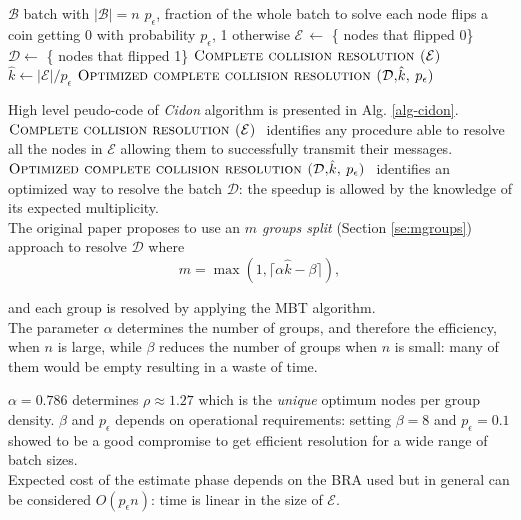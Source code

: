 \documentclass[11pt,a4paper,twoside,openright]{book}
\newcommand{\pc}{p_{\epsilon}}
\newcommand{\algname}[1]{\ensuremath{\mbox{\sc #1}}}
\begin{document}
 \begin{algorithm}[h!]
\begin{algorithmic}[1]
	\REQUIRE $\mathcal{B}$ batch with $|\mathcal{B}|=n$
	\REQUIRE $\pc$, fraction of the whole batch to solve
	\STATE {}
	\STATE each node flips a coin getting 0 with probability $\pc$, 1 otherwise
	\STATE $\mathcal{E} \,\gets$ \{ nodes that flipped 0\}
	\STATE $\mathcal{D} \gets$ \{ nodes that flipped 1\}
	\STATE \algname{Complete collision resolution ($\mathcal{E}$) }
	\STATE  $\hat{k} \gets |\mathcal{E}|/\pc$
	\STATE {}
	\STATE \algname{Optimized complete collision resolution ($\mathcal{D}$,$\hat{k}$, $\pc$) }
	\end{algorithmic}
\caption{\algname{Cidon($\mathcal{B}$, $\pc$)}}
\label{alg-cidon}
\end{algorithm}
 High level peudo-code of \emph{Cidon} algorithm is presented in Alg. \ref{alg-cidon}.\\ \algname{Complete collision resolution ($\mathcal{E}$) } identifies any procedure able to resolve all the nodes in $\mathcal{E}$ allowing them to successfully transmit their messages.\\ \algname{Optimized complete collision resolution ($\mathcal{D}$,$\hat{k}$, $\pc$) } identifies an optimized way to resolve the batch $\mathcal{D}$: the speedup is allowed by the knowledge of its expected multiplicity.\\
 
 The original paper proposes to use an \emph{$m$ groups split} (Section \ref{se:mgroups}) approach to resolve $\mathcal{D}$ where 
 \begin{equation}
m = \max(1, \lceil\alpha \hat{k}-\beta\rceil),
\end{equation}

and each group is resolved by applying the MBT algorithm.\\
The parameter $\alpha$ determines the number of groups, and therefore the efficiency, when $n$ is large, while $\beta$  reduces the number of groups when $n$ is small: many of them would be empty resulting in a waste of time. 
 
 $\alpha=0.786$ determines $\rho\approx 1.27$ which is the \emph{unique} optimum  nodes per group density. $\beta$ and $\pc$ depends on operational requirements: setting $\beta=8$ and  $\pc=0.1$ showed to be a good compromise to get efficient resolution for a wide range of batch sizes.\\  
 
Expected  cost of the estimate phase depends on the BRA used but in general can be considered $O(\pc n)$: time is linear in the size of $\mathcal{E}$.
\end{document}
